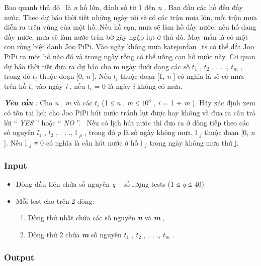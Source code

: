 

Bao quanh thủ đô  là \emph{ n } hồ lớn, đánh số từ 1 đến \emph{ n } . Ban đầu các hồ đều đầy nước. Theo dự báo thời tiết những ngày tới sẽ có các trận mưa lớn, mỗi trận mưa diễn ra trên vùng của một hồ. Nếu hồ cạn, mưa sẽ làm hồ đầy nước, nếu hồ đang đầy nước, mưa sẽ làm nước tràn bờ gây ngập lụt ở thủ đô. May mắn là có một con rồng biệt danh Joo PiPi. Vào ngày không mưa katejordan\_ts có thể dắt Joo PiPi ra một hồ nào đó và trong ngày rồng có thể uống cạn hồ nước này. Cơ quan dự báo thời tiết đưa ra dự báo cho m ngày dưới dạng các số \emph{ $t_{1}$} , \emph{ $t_{2}$} , . . ., \emph{ $t_{m}$} , trong đó \emph{ $t_{i}$} thuộc đoạn [0, \emph{ n } ]. Nếu \emph{ $t_{i}$} thuộc đoạn [1, \emph{ n } ] có nghĩa là sẽ có mưa trên hồ \emph{ $t_{i}$} vào ngày \emph{ i } , nếu \emph{ $t_{i}$} = 0 là ngày \emph{ i } không có mưa.

\emph{\textbf{Yêu cầu } : } Cho \emph{ n } , \emph{ m } và các \emph{ $t_{i}$} (1 ≤ \emph{ n } , \emph{ m } ≤ $10^{6}$ , \emph{ i } = 1 ÷ \emph{ m } ). Hãy xác định xem có tồn tại lịch cho Joo PiPi hút nước tránh lụt được hay không và đưa ra câu trả lời “ \emph{ YES } ” hoặc “ \emph{ NO } ”.  Nếu có lịch hút nước thì đưa ra ở dòng tiếp theo các số nguyên $l_{1}$ , $l_{2}$ , . . ., l \emph{$_ p $} , trong đó \emph{ p } là số ngày không mưa, l \emph{$_ j $} thuộc đoạn [0, \emph{ n } ]. Nếu l \emph{$_ j $} ≠ 0 có nghĩa là cần hút nước ở hồ l \emph{$_ j $} trong ngày không mưa thứ j.

\subsubsection{Input}
\begin{itemize}
	\item 

Dòng đầu tiên chứa số nguyên \emph{ q } – số lượng tests (1 ≤ \emph{ q } ≤ 40)
	\item Mỗi test cho trên 2 dòng:
\begin{enumerate}
	\item Dòng thứ nhất chứa các số nguyên \textbf{\emph{ n }} và \textbf{\emph{ m }} ,
	\item Dòng thứ 2 chứa \textbf{\emph{ m }} số nguyên \textbf{\emph{ $t_{1}$}} , \textbf{\emph{ $t_{2}$}} , . . ., \textbf{\emph{ $t_{m}$}} .
\end{enumerate}
\end{itemize}

\subsubsection{Output}

